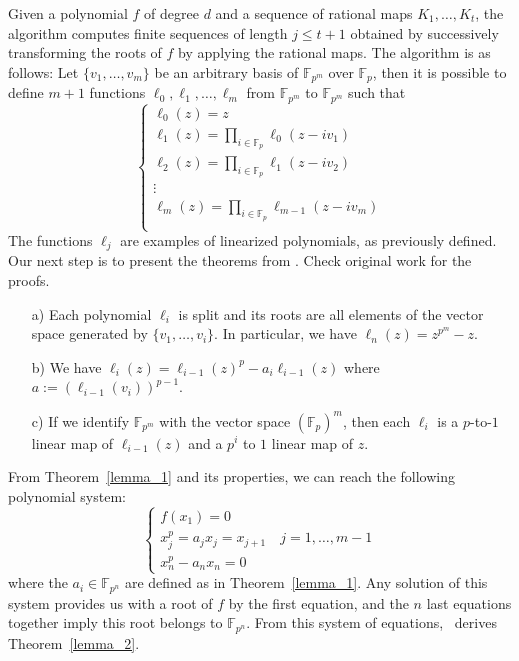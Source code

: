 Given a polynomial $f$ of degree $d$ and a sequence of rational maps $K_1,\ldots, K_t$, the algorithm computes finite sequences of length $j \leq t+1$ obtained by successively transforming the roots of $f$ by applying the rational maps. The algorithm is as follows: Let $\{v_1,\ldots,v_m\}$ be an arbitrary basis of $\mathbb{F}_{p^m}$ over $\mathbb{F}_p$, then it is possible to define $m+1$ functions $\ell_0, \ell_1,\ldots, \ell_m$ from $\mathbb{F}_{p^m}$ to $\mathbb{F}_{p^m}$ such that
$$
\left \{
\begin{array}{l}
     \ell_0(z) = z\\
     \ell_1(z) = \prod_{i\in \mathbb{F}_p}\ell_0(z-iv_1)\\
     \ell_2(z) = \prod_{i\in \mathbb{F}_p}\ell_1(z-iv_2)\\
     \vdots \\
     \ell_m(z) = \prod_{i\in \mathbb{F}_p}\ell_{m-1}(z-iv_m)\\
\end{array}
\right.
$$
The functions $\ell_j$ are examples of linearized polynomials, as previously defined. Our next step is to present the theorems from \cite{petit2014finding}. Check original work for the proofs.
\begin{theorem}\label{lemma_1}
\begin{itemize}
    \item[a)] Each polynomial $\ell_i$ is split and its roots are all elements of the vector space generated by $\{v_1, \ldots,v_i\}$. In particular, we have $\ell_n(z) = z^{p^m} -z$.
    \item[b)] We have $\ell_i(z)  = \ell_{i-1}(z)^p - a_i\ell_{i-1}(z)$ where $a := (\ell_{i-1}(v_i))^{p-1}$.
    \item[c)] If we identify $\mathbb{F}_{p^m}$ with the vector space $(\mathbb{F}_p)^m$, then each $\ell_i$ is a $p$-to-$1$ linear map of $\ell_{i-1}(z)$ and a $p^i$ to $1$ linear map of $z$.
\end{itemize}
\end{theorem}

From Theorem~\ref{lemma_1} and its properties, we can reach the following polynomial system:
\begin{equation}\label{eq:system_1}
    \left \{
\begin{array}{l}
    f(x_1) = 0\\
     x_j^p = a_jx_j = x_{j+1} \quad j=1,\ldots, m-1\\
     x_n^p - a_nx_n = 0
\end{array}
\right.
\end{equation}
where the $a_i \in \mathbb{F}_{p^n}$ are defined as in Theorem~\ref{lemma_1}. Any solution of this system provides us with a root of $f$ by the first equation, and the $n$ last equations together imply this root belongs to $\mathbb{F}_{p^n}$. From this system of equations,~\cite{petit2014finding} derives Theorem~\ref{lemma_2}.

